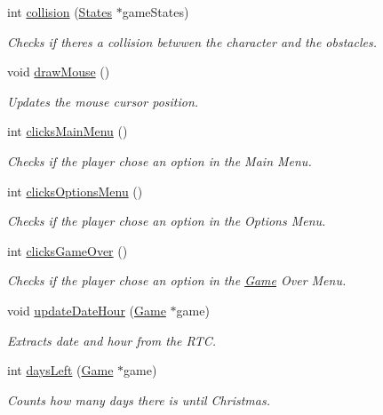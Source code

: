 \begin{DoxyCompactItemize}
int \hyperlink{group___graphics_ga9c0ab323b39cd0254dbfdaa80dcac495}{collision} (\hyperlink{struct_states}{States} $\ast$game\+States)
\begin{DoxyCompactList}\small\item\em Checks if there\textquotesingle{}s a collision betwwen the character and the obstacles. \end{DoxyCompactList}\item 
void \hyperlink{group___graphics_gaab7430a217db9969c46ead48adffbd05}{draw\+Mouse} ()
\begin{DoxyCompactList}\small\item\em Updates the mouse cursor position. \end{DoxyCompactList}\item 
int \hyperlink{group___graphics_gad474a474d64464f56c893125ae05fe15}{clicks\+Main\+Menu} ()
\begin{DoxyCompactList}\small\item\em Checks if the player chose an option in the Main Menu. \end{DoxyCompactList}\item 
int \hyperlink{group___graphics_gad55a59d3fd603520980e4794f29e83bd}{clicks\+Options\+Menu} ()
\begin{DoxyCompactList}\small\item\em Checks if the player chose an option in the Options Menu. \end{DoxyCompactList}\item 
int \hyperlink{group___graphics_ga7b226a076e2fce195972329b07d54956}{clicks\+Game\+Over} ()
\begin{DoxyCompactList}\small\item\em Checks if the player chose an option in the \hyperlink{struct_game}{Game} Over Menu. \end{DoxyCompactList}\item 
void \hyperlink{group___graphics_gacffa4b2e3dcebc554a5c24dec748eb04}{update\+Date\+Hour} (\hyperlink{struct_game}{Game} $\ast$game)
\begin{DoxyCompactList}\small\item\em Extracts date and hour from the R\+TC. \end{DoxyCompactList}\item 
int \hyperlink{group___graphics_ga16779210d6883bbec22aaed4546c2738}{days\+Left} (\hyperlink{struct_game}{Game} $\ast$game)
\begin{DoxyCompactList}\small\item\em Counts how many days there is until Christmas. \end{DoxyCompactList}\item 

\end{DoxyCompactItemize}
